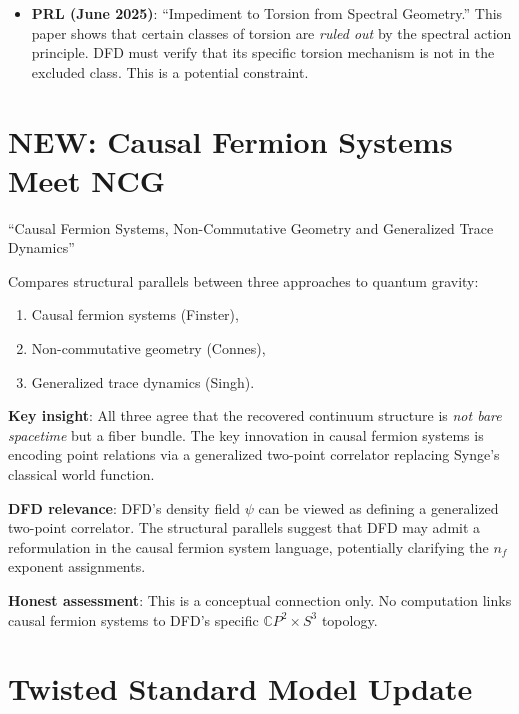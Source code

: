 \documentclass[11pt,a4paper]{article}
\newcommand{\NEW}{\textcolor{dfdblue}{\textbf{NEW}}}
\newcommand{\CP}{\mathbb{C}P}
\begin{document}
\begin{itemize}
\item \textbf{PRL (June 2025)}: ``Impediment to Torsion from Spectral Geometry.'' This paper shows that certain classes of torsion are \emph{ruled out} by the spectral action principle. DFD must verify that its specific torsion mechanism is not in the excluded class. This is a potential constraint.
\end{itemize}

\section{\NEW: Causal Fermion Systems Meet NCG}

\begin{tcolorbox}[colback=blue!5!white, colframe=blue!60!black,
  title={Farnsworth, Finster, Paganini \& Singh (arXiv:2603.05018, March 2026)}]
``Causal Fermion Systems, Non-Commutative Geometry and Generalized Trace Dynamics''

Compares structural parallels between three approaches to quantum gravity:
\begin{enumerate}
\item Causal fermion systems (Finster),
\item Non-commutative geometry (Connes),
\item Generalized trace dynamics (Singh).
\end{enumerate}

\textbf{Key insight}: All three agree that the recovered continuum structure is \emph{not bare spacetime} but a fiber bundle. The key innovation in causal fermion systems is encoding point relations via a generalized two-point correlator replacing Synge's classical world function.

\textbf{DFD relevance}: DFD's density field $\psi$ can be viewed as defining a generalized two-point correlator. The structural parallels suggest that DFD may admit a reformulation in the causal fermion system language, potentially clarifying the $n_f$ exponent assignments.

\textbf{Honest assessment}: This is a conceptual connection only. No computation links causal fermion systems to DFD's specific $\CP^2 \times S^3$ topology.
\end{tcolorbox}

\section{Twisted Standard Model Update}
\end{document}
